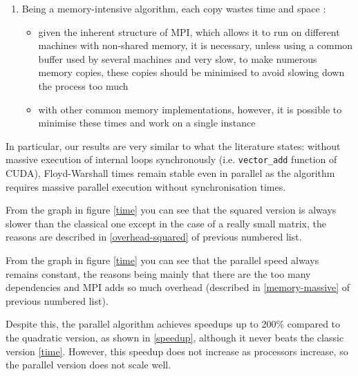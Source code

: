 \begin{enumerate}
\begin{itemize}
    \end{itemize}
    \item \label{memory-massive} Being a memory-intensive algorithm, each copy wastes time and space \cite{maras}:
    \begin{itemize}
        \item given the inherent structure of MPI, which allows it to run on different machines with non-shared memory, it is necessary, unless using a common buffer used by several machines and very slow, to make numerous memory copies, these copies should be minimised to avoid slowing down the process too much
        \item with other common memory implementations, however, it is possible to minimise these times and work on a single instance
    \end{itemize}
\end{enumerate}

In particular, our results are very similar to what the literature states: without massive execution of internal loops synchronously (i.e. \texttt{vector_add} function of CUDA), Floyd-Warshall times remain stable even in parallel as the algorithm requires massive parallel execution without synchronisation times.

From the graph in figure \cref{time} you can see that the squared version is always slower than the classical one except in the case of a really small matrix, the reasons are described in \cref{overhead-squared} of previous numbered list.

From the graph in figure \cref{time} you can see that the parallel speed always remains constant, the reasons being mainly that there are the too many dependencies and MPI adds so much overhead (described in \cref{memory-massive} of previous numbered list).

Despite this, the parallel algorithm achieves speedups up to 200\% compared to the quadratic version, as shown in \cref{speedup}, although it never beats the classic version \cref{time}. However, this speedup does not increase as processors increase, so the parallel version does not scale well.

